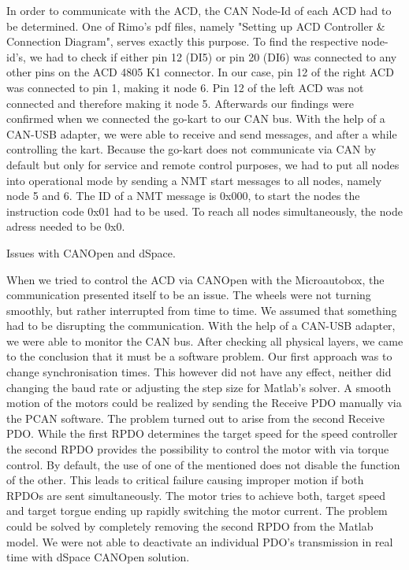 In order to communicate with the ACD, the CAN Node-Id of each ACD had to be determined. One of Rimo's pdf files, namely "Setting up ACD Controller \& Connection Diagram", serves exactly this purpose. 
To find the respective node-id's, we had to check if either pin 12 (DI5) or pin 20 (DI6) was connected to any other pins on the ACD 4805 K1 connector. In our case, pin 12 of the right ACD was connected to pin 1, making it node 6. Pin 12 of the left ACD was not connected and therefore making it node 5. Afterwards our findings were confirmed when we connected the go-kart to our CAN bus. With the help of a CAN-USB adapter, we were able to receive and send messages, and after a while controlling the kart.
Because the go-kart does not communicate via CAN by default but only for service and remote control purposes, we had to put all nodes into operational mode by sending a NMT start messages to all nodes, namely node 5 and 6.
The ID of a NMT message is 0x000, to start the nodes the instruction code 0x01 had to be used. To reach all nodes simultaneously, the node adress needed to be 0x0. 

Issues with CANOpen and dSpace. 

When we tried to control the ACD via CANOpen with the Microautobox, the communication presented itself to be an issue. The wheels were not turning smoothly, but rather interrupted from time to time. We assumed that something had to be disrupting the communication.
With the help of a CAN-USB adapter, we were able to monitor the CAN bus. After checking all physical layers, we came to the conclusion that it must be a software problem. Our first approach was to change synchronisation times. This however did not have any effect, neither did changing the baud rate or adjusting the step size for Matlab's solver.
A smooth motion of the motors could be realized by sending the Receive PDO manually via the PCAN software. The problem turned out to arise from the second Receive PDO. While the first RPDO determines the target speed for the speed controller the second RPDO provides the possibility to control the motor with via torque control. By default, the use of one of the mentioned does not disable the function of the other. This leads to critical failure causing improper motion if both RPDOs are sent simultaneously. The motor tries to achieve both, target speed and target torgue ending up rapidly switching the motor current. The problem could be solved by completely removing the second RPDO from the Matlab model. We were not able to deactivate an individual PDO's transmission in real time with dSpace CANOpen solution.



